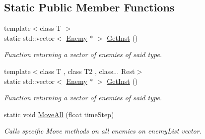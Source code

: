\subsection*{Static Public Member Functions}
\begin{DoxyCompactItemize}
\item 
{\footnotesize template$<$class T $>$ }\\static std\+::vector$<$ \hyperlink{class_enemy}{Enemy} $\ast$ $>$ \hyperlink{class_enemy_a747d610b1a24386b9bd85c50132ffa98}{Get\+Inst} ()
\begin{DoxyCompactList}\small\item\em Function returning a vector of enemies of said type. \end{DoxyCompactList}\item 
{\footnotesize template$<$class T , class T2 , class... Rest$>$ }\\static std\+::vector$<$ \hyperlink{class_enemy}{Enemy} $\ast$ $>$ \hyperlink{class_enemy_a4c0528b6b7e94cfbceada5bd00f7193d}{Get\+Inst} ()
\begin{DoxyCompactList}\small\item\em Function returning a vector of enemies of said type. \end{DoxyCompactList}\item 
static void \hyperlink{class_enemy_afcf5991522f6f881e97b5910ac353633}{Move\+All} (float time\+Step)
\begin{DoxyCompactList}\small\item\em Calls specific Move methods on all enemies on enemy\+List vector. \end{DoxyCompactList}\end{DoxyCompactItemize}
